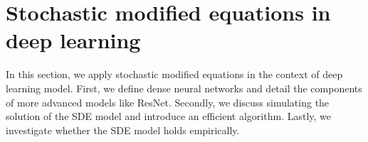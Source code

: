 \documentclass[12pt]{article}
\theoremstyle{definition}
\numberwithin{equation}{section}
\begin{document}

\section{Stochastic modified equations in deep learning}
\label{sec:smdedl}
In this section, we apply stochastic modified equations in the context of deep learning model. First, we define dense neural networks and detail the components of more advanced models like ResNet. Secondly, we discuss simulating the solution of the SDE model and introduce an efficient algorithm. Lastly, we investigate whether the SDE model holds empirically.
\end{document}
